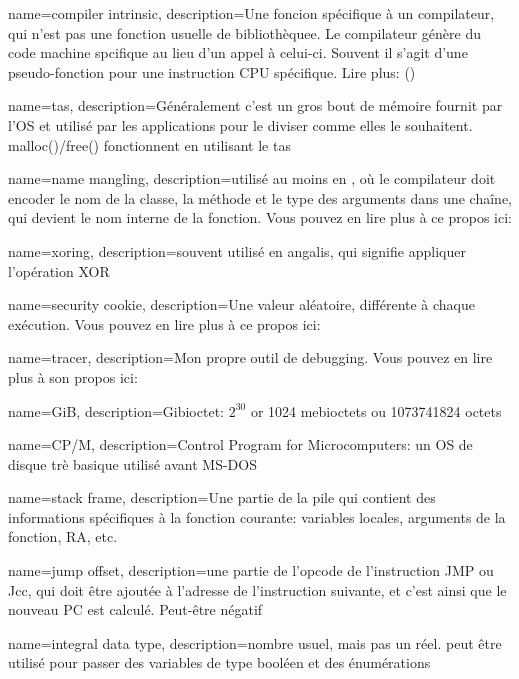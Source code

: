 {
  name=compiler intrinsic,
  description={Une foncion spécifique à un compilateur, qui n'est pas une fonction usuelle de bibliothèquee.
    Le compilateur génère du code machine spcifique au lieu d'un appel à celui-ci.
    Souvent il s'agit d'une pseudo-fonction pour une instruction \ac{CPU} spécifique. Lire plus:
    ()}
}

{
  name={tas},
  description={Généralement c'est un gros bout de mémoire fournit par l'\ac{OS} et utilisé par
  les applications pour le diviser comme elles le souhaitent. malloc()/free() fonctionnent en utilisant le tas}
}

{
  name=name mangling,
  description={utilisé au moins en \Cpp, où le compilateur doit encoder le nom de la classe, la méthode et le type des arguments dans une chaîne,
  qui devient le nom interne de la fonction. Vous pouvez en lire plus à ce propos ici: }
}

{
  name=xoring,
  description={souvent utilisé en angalis, qui signifie appliquer l'opération \ac{XOR}}
}

{
  name=security cookie,
  description={Une valeur aléatoire, différente à chaque exécution. Vous pouvez en lire plus à ce propos ici: }
}

{
  name=tracer,
  description={Mon propre outil de debugging. Vous pouvez en lire plus à son propos ici: }
}

{
  name=GiB,
  description={Gibioctet: $2^{30}$ or 1024 mebioctets ou 1073741824 octets}
}

{
  name=CP/M,
  description={Control Program for Microcomputers: 
  un \ac{OS} de disque trè basique utilisé avant MS-DOS}
}

{
  name=stack frame,
  description={Une partie de la pile qui contient des informations spécifiques à la fonction courante:
  variables locales, arguments de la fonction, \ac{RA}, etc.}
}

{
  name=jump offset,
  description={une partie de l'opcode de l'instruction JMP ou Jcc, qui doit être ajoutée à l'adresse de l'instruction suivante,
  et c'est ainsi que le nouveau \ac{PC} est calculé. Peut-être négatif}
}

{
  name={integral data type},
  description={nombre usuel, mais pas un réel. peut être utilisé pour passer des variables de type booléen et des énumérations}
}

